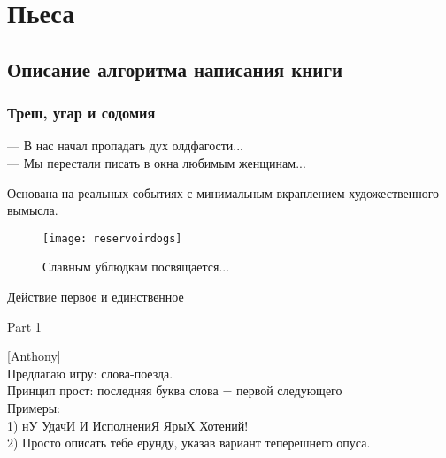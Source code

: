 \section*{Пьеса}
\subsection*{Описание алгоритма написания книги}
\subsubsection*{Треш, угар и содомия} %
\begin{epigraph}
    --- В нас начал пропадать дух олдфагости...\\
    --- Мы перестали писать в окна любимым женщинам...
\end{epigraph}

Основана на реальных событиях с минимальным вкраплением художественного вымысла.\\ 

\begin{figure}[ht!]
    \centering
    \texttt{[image: reservoirdogs]}
    \caption{Славным ублюдкам посвящается...}
\end{figure}

\begin{center}
\Large Действие первое и единственное %
\end{center}


{\small{}}


{\small{}}

\begin{center}
\large Part 1
\end{center}


[Anthony]\\
Предлагаю игру: слова-поезда.\\
Принцип прост: последняя буква слова = первой следующего\\
Примеры:\\
1) нУ УдачИ И ИсполнениЯ ЯрыХ Хотений!\\
2) Просто описать тебе ерунду, указав вариант теперешнего опуса.


